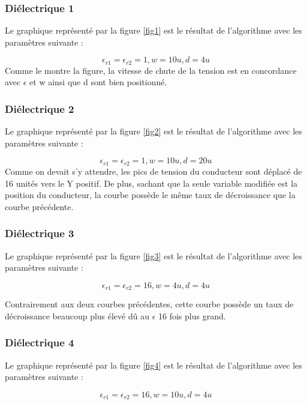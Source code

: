 \subsubsection{Diélectrique 1}
Le graphique représenté par la figure \ref{fig1} est le résultat de l'algorithme avec les paramètres suivante : 

\begin{displaymath}
\epsilon_{r1} = \epsilon_{r2} = 1, w= 10 u, d = 4 u
\end{displaymath}
Comme le montre la figure, la vitesse de chute de la tension est en concordance avec $\epsilon$ et w ainsi que d sont bien positionné.

\subsubsection{Diélectrique 2}
Le graphique représenté par la figure \ref{fig2} est le résultat de l'algorithme avec les paramètres suivante : 

\begin{displaymath}
\epsilon_{r1} = \epsilon_{r2} = 1, w= 10 u, d = 20 u
\end{displaymath}
Comme on devait s'y attendre, les pics de tension du conducteur sont déplacé de 16 unités vers le Y positif. De plus, sachant que la seule variable modifiée est la position du conducteur, la courbe possède le même taux de décroissance que la courbe précédente.

\subsubsection{Diélectrique 3}
Le graphique représenté par la figure \ref{fig3} est le résultat de l'algorithme avec les paramètres suivante : 

\begin{displaymath}
\epsilon_{r1} = \epsilon_{r2} = 16, w= 4 u, d = 4 u
\end{displaymath}

Contrairement aux deux courbes précédentes, cette courbe possède un taux de décroissance beaucoup plus élevé dû au $\epsilon$ 16 fois plus grand.

\subsubsection{Diélectrique 4}
Le graphique représenté par la figure \ref{fig4} est le résultat de l'algorithme avec les paramètres suivante : 

\begin{displaymath}
\epsilon_{r1} = \epsilon_{r2} = 16, w= 10 u, d = 4 u
\end{displaymath}

